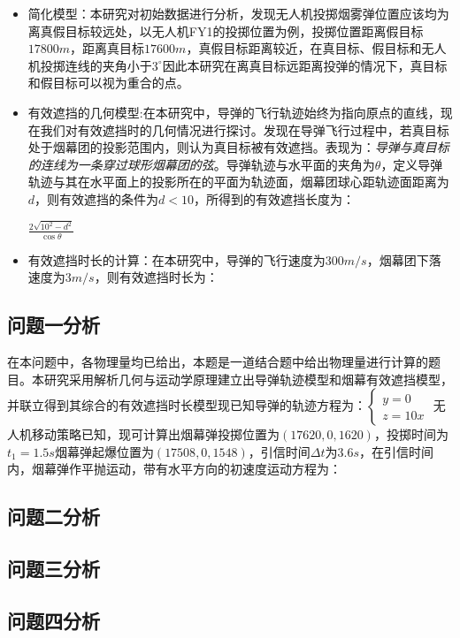\documentclass{article}
\begin{document}
\begin{itemize}
    \item 简化模型：本研究对初始数据进行分析，发现无人机投掷烟雾弹位置应该均为离真假目标较远处，以无人机FY1的投掷位置为例，投掷位置距离假目标$17800m$，距离真目标$17600m$，真假目标距离较近，在真目标、假目标和无人机投掷连线的夹角小于$3^\circ$因此本研究在离真目标远距离投弹的情况下，真目标和假目标可以视为重合的点。
    \item 有效遮挡的几何模型:在本研究中，导弹的飞行轨迹始终为指向原点的直线，现在我们对有效遮挡时的几何情况进行探讨。发现在导弹飞行过程中，若真目标处于烟幕团的投影范围内，则认为真目标被有效遮挡。表现为：\textit{导弹与真目标的连线为一条穿过球形烟幕团的弦}。导弹轨迹与水平面的夹角为$\theta$，定义导弹轨迹与其在水平面上的投影所在的平面为轨迹面，烟幕团球心距轨迹面距离为$d$，则有效遮挡的条件为$d<10$，所得到的有效遮挡长度为：
    \begin{center}
        $\displaystyle \frac{2\sqrt{10^2-d^2}}{\cos\theta}$
    \end{center}
    \item 有效遮挡时长的计算：在本研究中，导弹的飞行速度为$300m/s$，烟幕团下落速度为$3m/s$，则有效遮挡时长为：
\end{itemize}
\subsection{问题一分析}
在本问题中，各物理量均已给出，本题是一道结合题中给出物理量进行计算的题目。本研究采用解析几何与运动学原理建立出导弹轨迹模型和烟幕有效遮挡模型，并联立得到其综合的有效遮挡时长模型现已知导弹的轨迹方程为：$\begin{cases}
    y = 0 \\
    z = 10x
\end{cases}$
无人机移动策略已知，现可计算出烟幕弹投掷位置为$(17620,0,1620)$，投掷时间为$t_1 = 1.5s$烟幕弹起爆位置为$(17508,0,1548)$，引信时间$\Delta t$为$3.6s$，在引信时间内，烟幕弹作平抛运动，带有水平方向的初速度运动方程为：

\subsection{问题二分析}

\subsection{问题三分析}

\subsection{问题四分析}
\end{document}
